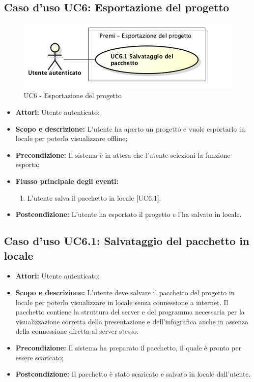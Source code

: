 \subsection{Caso d'uso UC6: Esportazione del progetto}
	\begin{figure}[h]
		\centering
		\includegraphics[scale=0.45] {img/UC6.png}
		\caption{UC6 - Esportazione del progetto}
	\end{figure}

	\begin{itemize}
		\item \textbf{Attori:} Utente autenticato;
		\item \textbf{Scopo e descrizione:} L'utente ha aperto un progetto e vuole esportarlo in locale per poterlo visualizzare offline;
		\item \textbf{Precondizione:} Il sistema è in attesa che l'utente selezioni la funzione esporta;
		\item \textbf{Flusso principale degli eventi:}
		\begin{enumerate}
			\item L'utente salva il pacchetto in locale [UC6.1].
		\end{enumerate}
		\item \textbf{Postcondizione:} L'utente ha esportato il progetto e l'ha salvato in locale.
	\end{itemize}

\subsection{Caso d'uso UC6.1: Salvataggio del pacchetto in locale}
	\begin{itemize}
		\item \textbf{Attori:} Utente autenticato;
		\item \textbf{Scopo e descrizione:} L'utente deve salvare il pacchetto del progetto in locale per poterlo visualizzare in locale senza connessione a internet. Il pacchetto contiene la struttura del server e del programma necessaria per la visualizzazione corretta della presentazione e dell'\gls{infografica} anche in assenza della connessione diretta al server stesso.
		\item \textbf{Precondizione:} Il sistema ha preparato il pacchetto, il quale è pronto per essere scaricato;
		\item \textbf{Postcondizione:} Il pacchetto è stato scaricato e salvato in locale dall'utente.
	\end{itemize}

